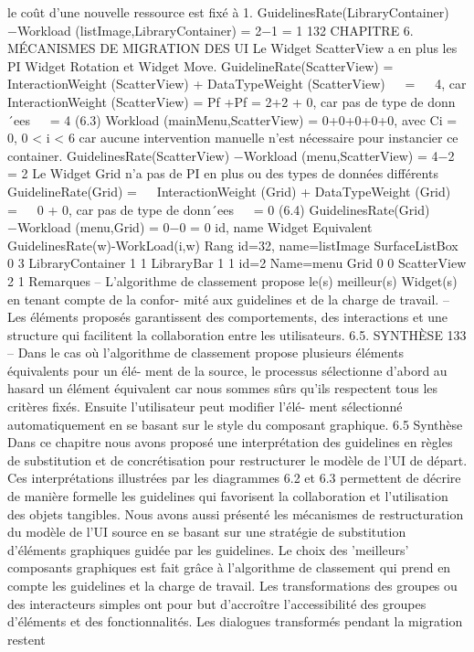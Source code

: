 \documentclass{article}
\begin{document}
le coût d’une nouvelle ressource est ﬁxé à 1.
GuidelinesRate(LibraryContainer) −Workload (listImage,LibraryContainer) = 2−1
= 1
132
CHAPITRE 6. MÉCANISMES DE MIGRATION DES UI
Le Widget ScatterView a en plus les PI Widget Rotation et Widget Move.
GuidelineRate(ScatterView) =


InteractionWeight (ScatterView)
+
DataTypeWeight (ScatterView)


=


4, car InteractionWeight (ScatterView) = Pf +Pf = 2+2
+
0, car pas de type de donn´ees


= 4
(6.3)
Workload (mainMenu,ScatterView) = 0+0+0+0+0,
avec Ci = 0, 0 < i < 6 car aucune intervention manuelle n’est nécessaire pour instancier ce container.
GuidelinesRate(ScatterView) −Workload (menu,ScatterView) = 4−2
= 2
Le Widget Grid n’a pas de PI en plus ou des types de données différents
GuidelineRate(Grid) =


InteractionWeight (Grid)
+
DataTypeWeight (Grid)


=


0
+
0, car pas de type de donn´ees


= 0
(6.4)
GuidelinesRate(Grid)−Workload (menu,Grid) = 0−0
= 0
id, name
Widget Equivalent
GuidelinesRate(w)-WorkLoad(i,w)
Rang
id=32, name=listImage
SurfaceListBox
0
3
LibraryContainer
1
1
LibraryBar
1
1
id=2 Name=menu
Grid
0
0
ScatterView
2
1
Remarques
– L’algorithme de classement propose le(s) meilleur(s) Widget(s) en tenant compte de la confor-
mité aux guidelines et de la charge de travail.
– Les éléments proposés garantissent des comportements, des interactions et une structure qui
facilitent la collaboration entre les utilisateurs.
6.5. SYNTHÈSE
133
– Dans le cas où l’algorithme de classement propose plusieurs éléments équivalents pour un élé-
ment de la source, le processus sélectionne d’abord au hasard un élément équivalent car nous
sommes sûrs qu’ils respectent tous les critères ﬁxés. Ensuite l’utilisateur peut modiﬁer l’élé-
ment sélectionné automatiquement en se basant sur le style du composant graphique.
6.5
Synthèse
Dans ce chapitre nous avons proposé une interprétation des guidelines en règles de substitution
et de concrétisation pour restructurer le modèle de l’UI de départ. Ces interprétations illustrées par
les diagrammes 6.2 et 6.3 permettent de décrire de manière formelle les guidelines qui favorisent la
collaboration et l’utilisation des objets tangibles.
Nous avons aussi présenté les mécanismes de restructuration du modèle de l’UI source en se
basant sur une stratégie de substitution d’éléments graphiques guidée par les guidelines. Le choix des
’meilleurs’ composants graphiques est fait grâce à l’algorithme de classement qui prend en compte
les guidelines et la charge de travail.
Les transformations des groupes ou des interacteurs simples ont pour but d’accroître l’accessibilité
des groupes d’éléments et des fonctionnalités. Les dialogues transformés pendant la migration restent
\end{document}
